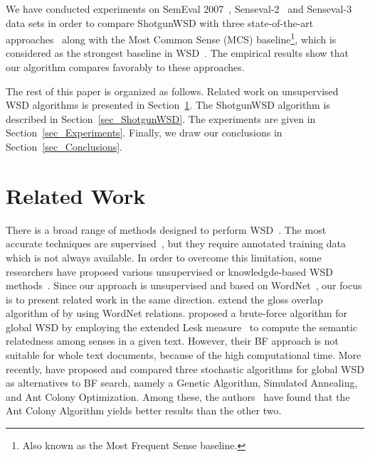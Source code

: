 \documentclass[11pt]{article}
\begin{document}
We have conducted experiments on SemEval 2007~\cite{SemEval-task7-2007}, Senseval-2~\cite{Senseval2-2001} and Senseval-3~\cite{Senseval3-2004} data sets in order to compare ShotgunWSD with three state-of-the-art approaches~\cite{Schwab-WET-2013,Chen-EMNLP-2014,Bhingardive-NAACL-2015} along with the Most Common Sense (MCS) baseline\footnote{Also known as the Most Frequent Sense baseline.}, which is considered as the strongest baseline in WSD~\cite{agirre-2006}. The empirical results show that our algorithm compares favorably to these approaches.

The rest of this paper is organized as follows. Related work on unsupervised WSD algorithms is presented in Section~\ref{sec_RelatedWork}. The ShotgunWSD algorithm is described in Section~\ref{sec_ShotgunWSD}. The experiments are given in Section~\ref{sec_Experiments}. Finally, we draw our conclusions in Section~\ref{sec_Conclusions}.

\section{Related Work}
\label{sec_RelatedWork}

There is a broad range of methods designed to perform WSD~\cite{agirre-2006,Navigli-WSD-2009,VidhuBhala-AIR-2014}. The most accurate techniques are supervised~\cite{Navigli-ACL-2016}, but they require annotated training data which is not always available. In order to overcome this limitation, some researchers have proposed various unsupervised or knowledgde-based WSD methods~\cite{Banerjee-CICLING-2002,Banerjee-IJCAI-2003,Schwab-COLING-2012,Nguyen-AIR-2013,Schwab-WET-2013,GETALP-2013,Chen-EMNLP-2014,Agirre-COLI-2014,Bhingardive-NAACL-2015}. Since our approach is unsupervised and based on WordNet~\cite{Miller-WN-1995,Fellbaum-WN-1998}, our focus is to present related work in the same direction.  extend the gloss overlap algorithm of  by using WordNet relations.  proposed a brute-force algorithm for global WSD by employing the extended Lesk measure~\cite{Banerjee-CICLING-2002,Banerjee-IJCAI-2003} to compute the semantic relatedness among senses in a given text. However, their BF approach is not suitable for whole text documents, because of the high computational time. More recently,  have proposed and compared three stochastic algorithms for global WSD as alternatives to BF search, namely a Genetic Algorithm, Simulated Annealing, and Ant Colony Optimization. Among these, the authors~\cite{Schwab-COLING-2012,Schwab-WET-2013} have found that the Ant Colony Algorithm yields better results than the other two.
\end{document}
